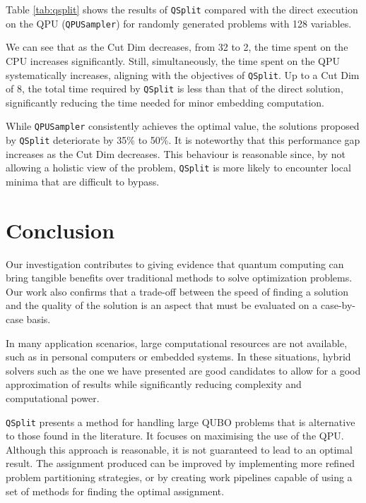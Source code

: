 \documentclass{ceurart}
\begin{document}
Table \ref{tab:qsplit} shows the results of \texttt{QSplit} compared with the direct execution on the QPU (\texttt{QPUSampler}) for randomly generated problems with 128 variables.

We can see that as the Cut Dim decreases, from 32 to 2, the time spent on the CPU increases significantly. Still, simultaneously, the time spent on the QPU systematically increases, aligning with the objectives of \texttt{QSplit}.
Up to a Cut Dim of 8, the total time required by \texttt{QSplit} is less than that of the direct solution, significantly reducing the time needed for minor embedding computation.

While \texttt{QPUSampler} consistently achieves the optimal value, the solutions proposed by \texttt{QSplit} deteriorate by 35\% to 50\%. It is noteworthy that this performance gap increases as the Cut Dim decreases. This behaviour is reasonable since, by not allowing a holistic view of the problem, \texttt{QSplit} is more likely to encounter local minima that are difficult to bypass.

\section{Conclusion}

Our investigation contributes to giving evidence that quantum computing can bring tangible benefits over traditional methods to solve optimization problems. Our work also confirms that a trade-off between the speed of finding a solution and the quality of the solution is an aspect that must be evaluated on a case-by-case basis.

In many application scenarios, large computational resources are not available, such as in personal computers or embedded systems. In these situations, hybrid solvers such as the one we have presented are good candidates to allow for a good approximation of results while significantly reducing complexity and computational power.

\verb|QSplit| presents a method for handling large QUBO problems that is alternative to those found in the literature\cite{subqubo1}\cite{subqubo2}. It focuses on maximising the use of the QPU. Although this approach is reasonable, it is not guaranteed to lead to an optimal result. The assignment produced can be improved by implementing more refined problem partitioning strategies\cite{bnb}, or by creating work pipelines capable of using a set of methods for finding the optimal assignment\cite{dwavehybrid}.


\end{document}
